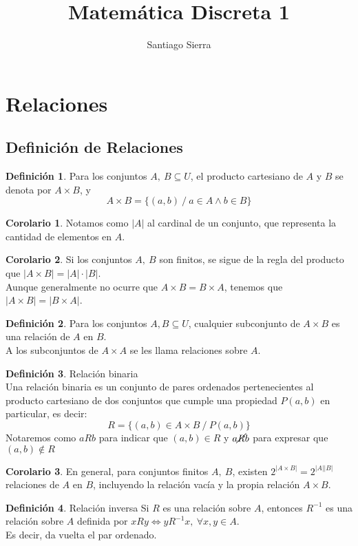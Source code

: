 \documentclass[10pt]{article}
\title{Matemática Discreta 1}
\author{Santiago Sierra}
\theoremstyle{definition}
\newtheorem{definition}{Definición}[section]
\newtheorem{corollary}{Corolario}[theorem]
\begin{document}
\maketitle \tableofcontents \newpage
\section{Relaciones}
\subsection{Definición de Relaciones}
\begin{definition}
	Para los conjuntos $A,\ B \subseteq U$, el producto cartesiano de $A$ y $B$ se denota por $A\times B$, y $$A\times B=\{(a,b)\ /\ a\in A \wedge b\in B\}$$
\end{definition}
\begin{corollary}
	Notamos como $|A|$ al cardinal de un conjunto, que representa la cantidad de elementos en $A$.
\end{corollary}
\begin{corollary}
	Si los conjuntos $A,\ B$ son finitos, se sigue de la regla del producto que $|A\times B|=|A|\cdot|B|$.\\
	Aunque generalmente no ocurre que $A\times B=B\times A$, tenemos que $|A\times B|=|B\times A|$.
\end{corollary}
\begin{definition}
	Para los conjuntos $A,B\subseteq U$, cualquier subconjunto de $A\times B$ es una relación de $A$ en $B$.\\
	A los subconjuntos de $A\times A$ se les llama relaciones sobre $A$.
\end{definition}
\begin{definition}{Relación binaria}
	\\Una relación binaria es un conjunto de pares ordenados pertenecientes al producto cartesiano de dos conjuntos que cumple una propiedad $P(a,b)$ en particular, es decir: $$R=\{(a,b)\in A\times B\ /\ P(a,b)\}$$
	Notaremos como $aRb$ para indicar que $(a,b)\in R$ y $a\cancel{R}b$ para expresar que $(a,b)\notin R$
\end{definition}
\begin{corollary}
	En general, para conjuntos finitos $A,\ B$, existen $2^{|A\times B|}=2^{|A||B|}$ relaciones de $A$ en $B$, incluyendo la relación vacía y la propia relación $A\times B$.
\end{corollary}
\begin{definition}{Relación inversa}
	Si $R$ es una relación sobre $A$, entonces $R^{-1}$ es una relación sobre $A$ definida por $xRy\Leftrightarrow yR^{-1}x,\ \forall x,y\in A$.
	\\Es decir, da vuelta el par ordenado.
\end{definition}
\end{document}

